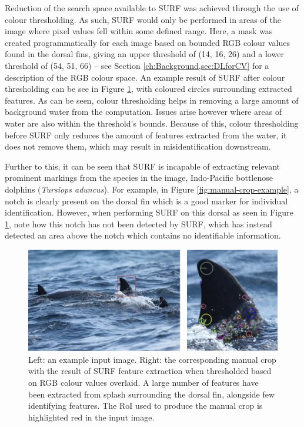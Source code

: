 Reduction of the search space available to SURF was achieved through the use of colour thresholding. As such, SURF would only be performed in areas of the image where pixel values fell within some defined range. Here, a mask was created programmatically for each image based on bounded RGB colour values found in the dorsal fins, giving an upper threshold of (14, 16, 26) and a lower threshold of (54, 51, 66) -- see Section \ref{ch:Background,sec:DLforCV} for a description of the RGB colour space. An example result of SURF after colour thresholding can be see in Figure \ref{fig:manual-crop-surf-colour-thresholding-example}, with coloured circles surrounding extracted features. As can be seen, colour thresholding helps in removing a large amount of background water from the computation. Issues arise however where areas of water are also within the threshold's bounds. Because of this, colour thresholding before SURF only reduces the amount of features extracted from the water, it does not remove them, which may result in misidentification downstream.

Further to this, it can be seen that SURF is incapable of extracting relevant prominent markings from the species in the image, Indo-Pacific bottlenose dolphins (\textit{Tursiops aduncus}). For example, in Figure \ref{fig:manual-crop-example}, a notch is clearly present on the dorsal fin which is a good marker for individual identification. However, when performing SURF on this dorsal as seen in Figure \ref{fig:manual-crop-surf-colour-thresholding-example}, note how this notch has not been detected by SURF, which has instead detected an area above the notch which contains no identifiable information. 

\begin{figure}
	\begin{center}
		\includegraphics[scale=0.6]{Chapter4/figs/manual-crop-surf-colour-thresholding-axis.png}
	\end{center}
	\caption[Left: an example input image. Right: the corresponding manual crop with the result of SURF feature extraction when thresholded based on RGB colour values overlaid.]{Left: an example input image. Right: the corresponding manual crop with the result of SURF feature extraction when thresholded based on RGB colour values overlaid. A large number of features have been extracted from splash surrounding the dorsal fin, alongside few identifying features. The RoI used to produce the manual crop is highlighted red in the input image.
	}
	\label{fig:manual-crop-surf-colour-thresholding-example}
\end{figure}


